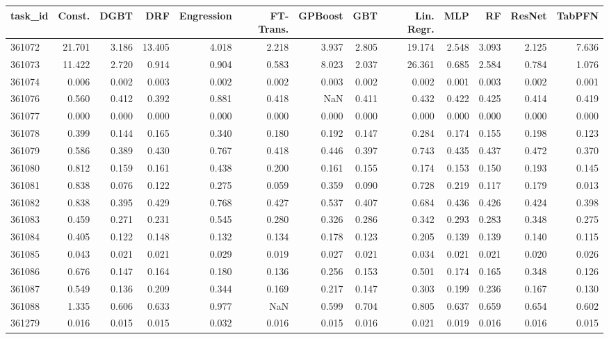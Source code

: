 \begin{tabular}{lrrrrrrrrrrrr}
\toprule
task\_id & Const. & DGBT & DRF & Engression & FT-Trans. & GPBoost & GBT & Lin. Regr. & MLP & RF & ResNet & TabPFN \\
\midrule
361072 & 21.701 & 3.186 & 13.405 & 4.018 & 2.218 & 3.937 & 2.805 & 19.174 & 2.548 & 3.093 & 2.125 & 7.636 \\
361073 & 11.422 & 2.720 & 0.914 & 0.904 & 0.583 & 8.023 & 2.037 & 26.361 & 0.685 & 2.584 & 0.784 & 1.076 \\
361074 & 0.006 & 0.002 & 0.003 & 0.002 & 0.002 & 0.003 & 0.002 & 0.002 & 0.001 & 0.003 & 0.002 & 0.001 \\
361076 & 0.560 & 0.412 & 0.392 & 0.881 & 0.418 & NaN & 0.411 & 0.432 & 0.422 & 0.425 & 0.414 & 0.419 \\
361077 & 0.000 & 0.000 & 0.000 & 0.000 & 0.000 & 0.000 & 0.000 & 0.000 & 0.000 & 0.000 & 0.000 & 0.000 \\
361078 & 0.399 & 0.144 & 0.165 & 0.340 & 0.180 & 0.192 & 0.147 & 0.284 & 0.174 & 0.155 & 0.198 & 0.123 \\
361079 & 0.586 & 0.389 & 0.430 & 0.767 & 0.418 & 0.446 & 0.397 & 0.743 & 0.435 & 0.437 & 0.472 & 0.370 \\
361080 & 0.812 & 0.159 & 0.161 & 0.438 & 0.200 & 0.161 & 0.155 & 0.174 & 0.153 & 0.150 & 0.193 & 0.145 \\
361081 & 0.838 & 0.076 & 0.122 & 0.275 & 0.059 & 0.359 & 0.090 & 0.728 & 0.219 & 0.117 & 0.179 & 0.013 \\
361082 & 0.838 & 0.395 & 0.429 & 0.768 & 0.427 & 0.537 & 0.407 & 0.684 & 0.436 & 0.426 & 0.424 & 0.398 \\
361083 & 0.459 & 0.271 & 0.231 & 0.545 & 0.280 & 0.326 & 0.286 & 0.342 & 0.293 & 0.283 & 0.348 & 0.275 \\
361084 & 0.405 & 0.122 & 0.148 & 0.132 & 0.134 & 0.178 & 0.123 & 0.205 & 0.139 & 0.139 & 0.140 & 0.115 \\
361085 & 0.043 & 0.021 & 0.021 & 0.029 & 0.019 & 0.027 & 0.021 & 0.034 & 0.021 & 0.021 & 0.020 & 0.026 \\
361086 & 0.676 & 0.147 & 0.164 & 0.180 & 0.136 & 0.256 & 0.153 & 0.501 & 0.174 & 0.165 & 0.348 & 0.126 \\
361087 & 0.549 & 0.136 & 0.209 & 0.344 & 0.169 & 0.217 & 0.147 & 0.303 & 0.199 & 0.236 & 0.167 & 0.130 \\
361088 & 1.335 & 0.606 & 0.633 & 0.977 & NaN & 0.599 & 0.704 & 0.805 & 0.637 & 0.659 & 0.654 & 0.602 \\
361279 & 0.016 & 0.015 & 0.015 & 0.032 & 0.016 & 0.015 & 0.016 & 0.021 & 0.019 & 0.016 & 0.016 & 0.015 \\

\end{tabular}
